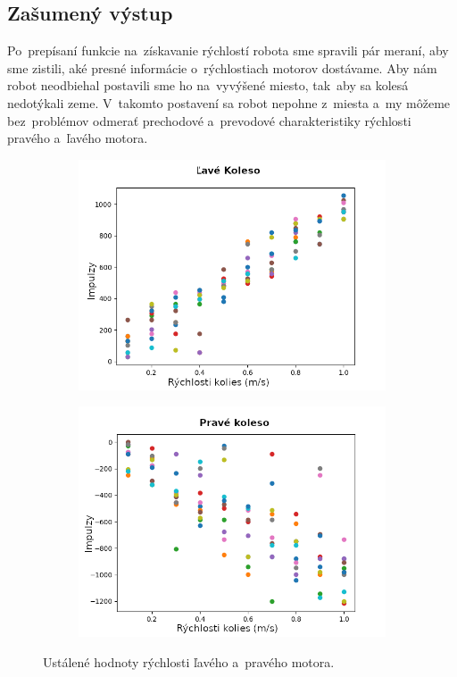 \subsection{Zašumený výstup}
\label{subsec:outputNoice}

Po~prepísaní funkcie na~získavanie rýchlostí robota sme spravili pár meraní, aby sme zistili, aké presné informácie o~rýchlostiach
motorov dostávame. Aby nám robot neodbiehal postavili sme ho na~vyvýšené miesto, tak~aby sa kolesá nedotýkali zeme. V~takomto
postavení sa robot nepohne z~miesta a~my môžeme bez~problémov odmerať prechodové a~prevodové charakteristiky rýchlosti pravého
a~ľavého motora.

\begin{figure}[!htbp]
	\begin{subfigure}{0.5\textwidth}
		\includegraphics[width=\textwidth]{img/Left_wheel_2.png}
	\end{subfigure}
	\hfill
	\begin{subfigure}{0.5\textwidth}
		\includegraphics[width=\textwidth]{img/Right_wheel_2.png}
	\end{subfigure}
	\caption{Ustálené hodnoty rýchlosti ľavého a~pravého motora. }
	\label{fig:lavePraveKoleso}
\end{figure}

